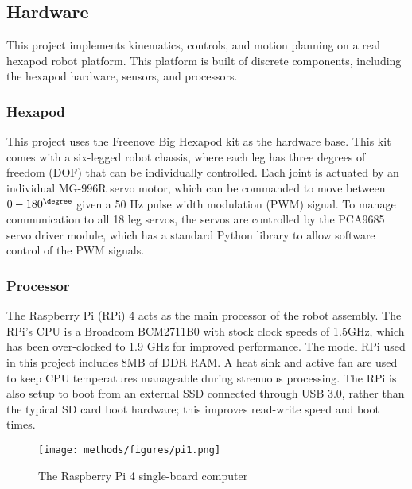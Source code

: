 \subsection{ Hardware }

 This project implements kinematics, controls, and motion planning on a real hexapod robot platform. This platform is built of discrete components, including the hexapod hardware, sensors, and processors.

\subsubsection{ Hexapod }

This project uses the Freenove Big Hexapod kit as the hardware base. This kit comes with a six-legged robot chassis, where each leg has three degrees of freedom (DOF) that can be individually controlled. Each joint is actuated by an individual MG-996R servo motor, which can be commanded to move between $0-180^{\degree}$ given a 50 Hz pulse width modulation (PWM) signal. To manage communication to all 18 leg servos, the servos are controlled by the PCA9685 servo driver module, which has a standard Python library to allow software control of the PWM signals.

\subsubsection{ Processor }
The Raspberry Pi (RPi) 4 acts as the main processor of the robot assembly.  The RPi's CPU is a Broadcom BCM2711B0 with stock clock speeds of 1.5GHz, which has been over-clocked to 1.9 GHz for improved performance.  The model RPi used in this project includes 8MB of DDR RAM. A heat sink and active fan are used to keep CPU temperatures manageable during strenuous processing. The RPi is also setup to boot from an external SSD connected through USB 3.0, rather than the typical SD card boot hardware; this improves read-write speed and boot times.

\begin{figure}[H]
    \centerline{\texttt{[image: methods/figures/pi1.png]}}
    \caption{The Raspberry Pi 4 single-board computer}
    \label{fig:raspberry_pi}
\end{figure}

